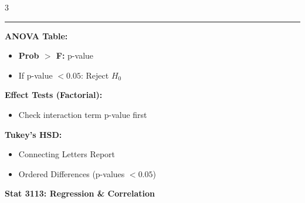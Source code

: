 \documentclass[7pt, letterpaper]{article}
\newcommand{\sectionhead}[1]{%
    \vspace{0.5mm}{\normalsize\bfseries#1}\vspace{0mm}\hrule\vspace{0.5mm}%
}
\begin{document}
\begin{multicols}{3}
\columnbreak

\sectionhead{Reading JMP Output}
\textbf{ANOVA Table:}
\begin{itemize}
    \item \textbf{Prob $>$ F:} p-value
    \item If p-value $< 0.05$: Reject $H_0$
\end{itemize}
\textbf{Effect Tests (Factorial):}
\begin{itemize}
    \item Check interaction term p-value first
\end{itemize}
\textbf{Tukey's HSD:}
\begin{itemize}
    \item Connecting Letters Report
    \item Ordered Differences (p-values $< 0.05$)
\end{itemize}

\end{multicols}

\newpage

\begin{center}
    {\Large\bfseries Stat 3113: Regression \& Correlation}
\end{center}
\vspace{-2mm}
\end{document}
